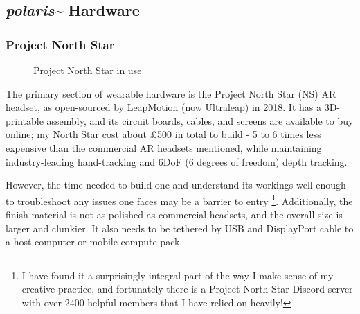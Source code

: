 \subsection{\textit{polaris\textasciitilde{}} Hardware}\label{sec: polaris-framework-hardware}
\subsubsection{Project North Star}\label{sec: polaris-framework-hardware-pns}

\begin{figure}
    \centering
    \hfill
    \caption{Project North Star in use}
\end{figure}

The primary section of wearable hardware is the Project North Star (NS) AR headset, as open-sourced by LeapMotion (now Ultraleap) in 2018. It has a 3D-printable assembly, and its circuit boards, cables, and screens are available to buy \href{https://docs.projectnorthstar.org}{online}; my North Star cost about £500 in total to build - 5 to 6 times less expensive than the commercial AR headsets mentioned, while maintaining industry-leading hand-tracking and 6DoF (6 degrees of freedom) depth tracking.

However, the time needed to build one and understand its workings well enough to trouble\-shoot any issues one faces may be a barrier to entry \footnote{I have found it a surprisingly integral part of the way I make sense of my creative practice, and fortunately there is a Project North Star Discord server with over 2400 helpful members that I have relied on heavily!}. Additionally, the finish material is not as polished as commercial headsets, and the overall size is larger and clunkier. It also needs to be tethered by USB and DisplayPort cable to a host computer or mobile compute pack.

